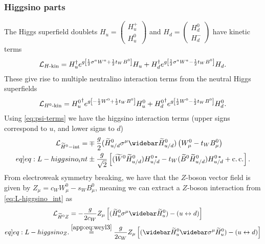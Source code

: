 \documentclass[english, notitlepage]{article}
\begin{document}
        \subsubsection{Higgsino parts}
            The Higgs superfield doublets $H_u = \begin{pmatrix} H_u^+ \\ H_u^0 \end{pmatrix}$ and $H_d = \begin{pmatrix} H_d^0 \\ H_d^- \end{pmatrix}$ have kinetic terms
            \begin{align}
                \mathcal{L}_{H\text{-kin}} = H_u^\dag e^{g\left[\frac{1}{2}\sigma^a W^a + \frac{1}{2}t_W B^0\right]} H_u + H_d^\dag e^{g\left[\frac{1}{2}\sigma^a W^a - \frac{1}{2}t_WB^0\right]} H_d.
            \end{align}
            These give rise to multiple neutralino interaction terms from the neutral Higgs superfields
            \begin{align}
                \mathcal{L}_{H^0\text{-kin}} = {H_u^0}^\dag e^{g\left[-\frac{1}{2}W^0 + \frac{1}{2}t_W B^0\right]} H_u^0 + {H_d^0}^\dag e^{g\left[\frac{1}{2}W^0 - \frac{1}{2}t_W B^0\right]} H_d^0.
            \end{align}
            Using \cref{eq:psi-terms} we have the higgsino interaction terms (upper signs correspond to $u$, and lower signs to $d$)
            \begin{align}
                \nonumber
                \L_{\wtilde{H}^0\mathrm{-int}} = & \mp \frac{g}{2} (\wtilde{H}^0_{u/d} \sigma^\mu \wbar{\wtilde{H}}^0_{u/d})\pclosed{W^0_\mu - t_W B^0_\mu}                                        \\
                \label[eq]{eq:L-higgsino_int}
                                                 & \pm \frac{g}{\sqrt{2}} \bclosed{(\wtilde{W}^0 \wtilde{H}^0_{u/d}) H^{0\,*}_{u/d} - t_W (\wtilde{B}^0 \wtilde{H}^0_{u/d}) H^{0\,*}_{u/d} + \cc}.
            \end{align}
            From electroweak symmetry breaking, we have that the \(Z\)-boson vector field is given by \(Z_\mu = c_W W^0_\mu - s_W B^0_\mu\), meaning we can extract a \(Z\)-boson interaction from \cref{eq:L-higgsino_int} as
            \begin{align}
                \nonumber
                \L_{\wtilde{H}^0Z} & = -\frac{g}{2c_W} Z_\mu \bclosed{(\hinou\sigma^\mu\barhinou) - (u \leftrightarrow d)}                                                \\
                \label[eq]{eq:L-higgsino_Z}.
                                   & \stackrel{\mathrm{\cref{app:eq:weyl3}}}{=} \frac{g}{2c_W} Z_\mu \bclosed{(\barhinou\wbar{\sigma}^\mu\hinou) - (u \leftrightarrow d)} \\
            \end{align}
\end{document}
